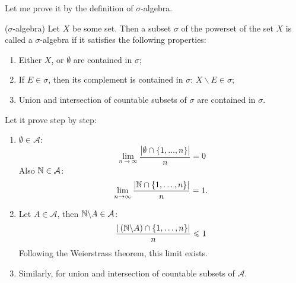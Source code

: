 \documentclass[12pt]{report}
\begin{document}
\begin{solution}
    Let me prove it by the definition of $\sigma$-algebra.
    \begin{definition}{($\sigma$-algebra)}{}
        Let $X$ be some set. Then a subset  $\sigma$ of the powerset of the set $X$ is called a $\sigma$-algebra if it satisfies the following properties:
        \begin{enumerate}
            \item Either $X$, or $\emptyset$ are contained in $\sigma$;
            \item If $E \in \sigma$, then its complement is contained in $\sigma$: $X \backslash E \in \sigma$;
            \item Union and intersection of countable subsets of $\sigma$ are contained in $\sigma$.
        \end{enumerate}
    \end{definition}
    Let it prove step by step:
    \begin{enumerate}
        \item $\emptyset \in \mathcal{A}$:
        \[
            \lim\limits_{n \to \infty} \dfrac{|\emptyset \cap \{1, \ldots, n\}|}{n} = 0  
        \]
        Also $\mathbb{N} \in \mathcal{A}$:
        \[
            \lim\limits_{n\to \infty} \dfrac{|\mathbb{N} \cap \{1, \ldots, n\}|}{n} = 1.  
        \]
        \item Let $A \in \mathcal{A}$, then $\mathbb{N} \backslash A \in \mathcal{A}$:
        \[
            \dfrac{|\left(\mathbb{N} \backslash A\right) \cap \{1, \ldots, n\}|}{n}  \leqslant 1
        \]
        Following the Weierstrass theorem, this limit exists.
        \item Similarly, for union and intersection of countable subsets of $\mathcal{A}$.
    \end{enumerate}
\end{solution}
\end{document}

